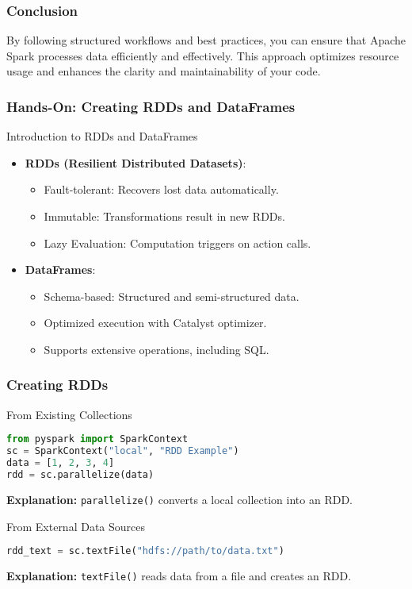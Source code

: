 \documentclass[aspectratio=169]{beamer}
\begin{document}
\begin{frame}
    \frametitle{Conclusion}
    By following structured workflows and best practices, you can ensure that Apache Spark processes data efficiently and effectively. This approach optimizes resource usage and enhances the clarity and maintainability of your code.
\end{frame}

\begin{frame}[fragile]
  \frametitle{Hands-On: Creating RDDs and DataFrames}
  \begin{block}{Introduction to RDDs and DataFrames}
    \begin{itemize}
      \item \textbf{RDDs (Resilient Distributed Datasets)}:
      \begin{itemize}
        \item Fault-tolerant: Recovers lost data automatically.
        \item Immutable: Transformations result in new RDDs.
        \item Lazy Evaluation: Computation triggers on action calls.
      \end{itemize}
      \item \textbf{DataFrames}:
      \begin{itemize}
        \item Schema-based: Structured and semi-structured data.
        \item Optimized execution with Catalyst optimizer.
        \item Supports extensive operations, including SQL.
      \end{itemize}
    \end{itemize}
  \end{block}
\end{frame}

\begin{frame}[fragile]
  \frametitle{Creating RDDs}
  \begin{block}{From Existing Collections}
    \begin{lstlisting}[language=Python]
from pyspark import SparkContext
sc = SparkContext("local", "RDD Example")
data = [1, 2, 3, 4]
rdd = sc.parallelize(data)
    \end{lstlisting}
    \textbf{Explanation:} \texttt{parallelize()} converts a local collection into an RDD.
  \end{block}

  \begin{block}{From External Data Sources}
    \begin{lstlisting}[language=Python]
rdd_text = sc.textFile("hdfs://path/to/data.txt")
    \end{lstlisting}
    \textbf{Explanation:} \texttt{textFile()} reads data from a file and creates an RDD.
  \end{block}
\end{frame}
\end{document}
